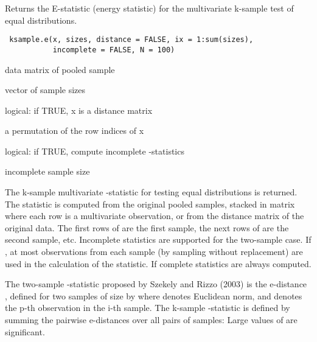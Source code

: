 \documentclass{article}
\begin{document}
\begin{Description}\relax
Returns the E-statistic (energy statistic)
for the multivariate k-sample test of equal distributions.
\end{Description}
\begin{Usage}
\begin{verbatim}
 ksample.e(x, sizes, distance = FALSE, ix = 1:sum(sizes), 
           incomplete = FALSE, N = 100)
\end{verbatim}
\end{Usage}
\begin{Arguments}
\begin{ldescription}
\item[\code{x}] data matrix of pooled sample
\item[\code{sizes}] vector of sample sizes
\item[\code{distance}] logical: if TRUE, x is a distance matrix
\item[\code{ix}] a permutation of the row indices of x 
\item[\code{incomplete}] logical: if TRUE, compute incomplete -statistics
\item[\code{N}] incomplete sample size
\end{ldescription}
\end{Arguments}
\begin{Details}\relax
The k-sample multivariate -statistic for testing equal distributions
is returned. The statistic is computed from the original pooled samples, stacked in 
matrix  where each row is a multivariate observation, or from the distance 
matrix  of the original data. The
first  rows of  are the first sample, the next
 rows of  are the second sample, etc. Incomplete statistics are 
supported for the two-sample case. If
, at most  observations from each sample 
(by sampling without replacement) are used in the calculation of the statistic.
If  complete statistics are always computed.

The two-sample -statistic proposed by Szekely and Rizzo (2003)
is the e-distance , defined for two samples 
of size  by
where
\eqn{\|\cdot\|}{|| ||} denotes Euclidean norm, and  denotes the p-th observation in the i-th sample.  
The k-sample  
-statistic is defined by summing the pairwise e-distances over 
all  pairs 
of samples:
Large values of  are significant.\end{Details}
\end{document}
